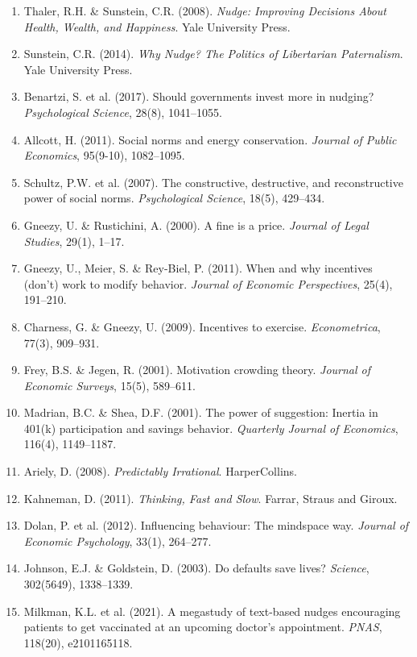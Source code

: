 \begin{enumerate}
    \item Thaler, R.H. \& Sunstein, C.R. (2008). \textit{Nudge: Improving Decisions About Health, Wealth, and Happiness}. Yale University Press.
    \item Sunstein, C.R. (2014). \textit{Why Nudge? The Politics of Libertarian Paternalism}. Yale University Press.
    \item Benartzi, S. et al. (2017). Should governments invest more in nudging? \textit{Psychological Science}, 28(8), 1041--1055.
    \item Allcott, H. (2011). Social norms and energy conservation. \textit{Journal of Public Economics}, 95(9-10), 1082--1095.
    \item Schultz, P.W. et al. (2007). The constructive, destructive, and reconstructive power of social norms. \textit{Psychological Science}, 18(5), 429--434.
    \item Gneezy, U. \& Rustichini, A. (2000). A fine is a price. \textit{Journal of Legal Studies}, 29(1), 1--17.
    \item Gneezy, U., Meier, S. \& Rey-Biel, P. (2011). When and why incentives (don't) work to modify behavior. \textit{Journal of Economic Perspectives}, 25(4), 191--210.
    \item Charness, G. \& Gneezy, U. (2009). Incentives to exercise. \textit{Econometrica}, 77(3), 909--931.
    \item Frey, B.S. \& Jegen, R. (2001). Motivation crowding theory. \textit{Journal of Economic Surveys}, 15(5), 589--611.
    \item Madrian, B.C. \& Shea, D.F. (2001). The power of suggestion: Inertia in 401(k) participation and savings behavior. \textit{Quarterly Journal of Economics}, 116(4), 1149--1187.
    \item Ariely, D. (2008). \textit{Predictably Irrational}. HarperCollins.
    \item Kahneman, D. (2011). \textit{Thinking, Fast and Slow}. Farrar, Straus and Giroux.
    \item Dolan, P. et al. (2012). Influencing behaviour: The mindspace way. \textit{Journal of Economic Psychology}, 33(1), 264--277.
    \item Johnson, E.J. \& Goldstein, D. (2003). Do defaults save lives? \textit{Science}, 302(5649), 1338--1339.
    \item Milkman, K.L. et al. (2021). A megastudy of text-based nudges encouraging patients to get vaccinated at an upcoming doctor's appointment. \textit{PNAS}, 118(20), e2101165118.
\end{enumerate}

